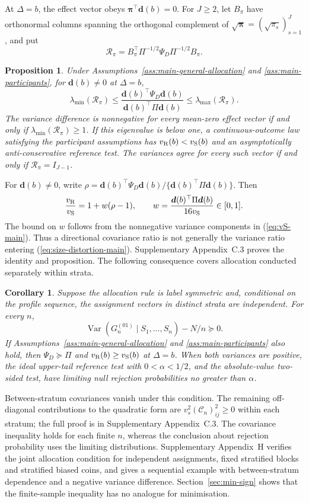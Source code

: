 \documentclass[12pt,a4paper]{article}
\newtheorem{proposition}{Proposition}
\newtheorem{corollary}{Corollary}
\theoremstyle{definition}
\newcommand{\Var}{\operatorname{Var}}
\begin{document}
At $\Delta=b$, the effect vector obeys $\bm\pi^\top\bm d(b)=0$. For $J\ge2$, let $B_\pi$ have orthonormal columns spanning the orthogonal complement of $\sqrt{\bm\pi}=(\sqrt{\pi_s})_{s=1}^J$, and put
\begin{equation}\label{eq:main-restricted-spectrum}
 \mathcal R_\pi=B_\pi^\top\Pi^{-1/2}\Psi_D\Pi^{-1/2}B_\pi.
\end{equation}
\begin{proposition}\label{prop:main-sign}
Under Assumptions~\ref{ass:main-general-allocation} and \ref{ass:main-participants}, for $\bm d(b)\ne0$ at $\Delta=b$,
\[
 \lambda_{\min}(\mathcal R_\pi)
 \le \frac{\bm d(b)^\top\Psi_D\bm d(b)}{\bm d(b)^\top\Pi\bm d(b)}
 \le \lambda_{\max}(\mathcal R_\pi).
\]
The variance difference is nonnegative for every mean-zero effect vector if and only if $\lambda_{\min}(\mathcal R_\pi)\ge1$. If this eigenvalue is below one, a continuous-outcome law satisfying the participant assumptions has $v_{\rm R}(b)<v_{\rm S}(b)$ and an asymptotically anti-conservative reference test. The variances agree for every such vector if and only if $\mathcal R_\pi=I_{J-1}$.
\end{proposition}
For $\bm d(b)\ne0$, write $\rho=\bm d(b)^\top\Psi_D\bm d(b)/\{\bm d(b)^\top\Pi\bm d(b)\}$. Then
\[
 \frac{v_{\rm R}}{v_{\rm S}}=1+w(\rho-1),\qquad
 w=\frac{\bm d(b)^\top\Pi\bm d(b)}{16v_{\rm S}}\in[0,1].
\]
The bound on $w$ follows from the nonnegative variance components in (\ref{eq:vS-main}). Thus a directional covariance ratio is not generally the variance ratio entering (\ref{eq:size-distortion-main}). Supplementary Appendix~C.3 proves the identity and proposition. The following consequence covers allocation conducted separately within strata.

\begin{corollary}\label{cor:main-stratified-sign}
Suppose the allocation rule is label symmetric and, conditional on the profile sequence, the assignment vectors in distinct strata are independent. For every $n$,
\[
 \Var(G_n^{(01)}\mid S_1,\ldots,S_n)-N/n\succeq0.
\]
If Assumptions~\ref{ass:main-general-allocation} and \ref{ass:main-participants} also hold, then $\Psi_D\succeq\Pi$ and $v_{\rm R}(b)\ge v_{\rm S}(b)$ at $\Delta=b$. When both variances are positive, the ideal upper-tail reference test with $0<\alpha<1/2$, and the absolute-value two-sided test, have limiting null rejection probabilities no greater than $\alpha$.
\end{corollary}
Between-stratum covariances vanish under this condition. The remaining off-diagonal contributions to the quadratic form are $v_s^2(\mathcal C_n)_{ij}^2\ge0$ within each stratum; the full proof is in Supplementary Appendix~C.3. The covariance inequality holds for each finite $n$, whereas the conclusion about rejection probability uses the limiting distributions. Supplementary Appendix~H verifies the joint allocation condition for independent assignments, fixed stratified blocks and stratified biased coins, and gives a sequential example with between-stratum dependence and a negative variance difference. Section~\ref{sec:min-sign} shows that the finite-sample inequality has no analogue for minimisation.
\end{document}
